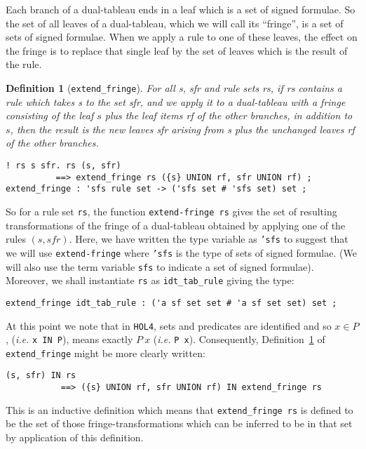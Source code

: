 \documentclass[a4paper]{article}
\newtheorem{definition}{Definition}
\newcommand{\hol}{\texttt{HOL4}}
\newcommand{\ie}{\textit{i.e. }}
\begin{document}
Each branch of a dual-tableau ends in a leaf which is a set of
signed formulae. So the set of all leaves of a dual-tableau, which we 
will call its ``fringe'', is a set of sets of signed formulae. 
When we apply a rule to one of these leaves, the effect on the fringe
is to replace that single leaf by the set of leaves 
which is the result of the rule.  
\begin{definition}[\texttt{extend\_fringe}]\label{extend-fringe}
  For all \textit{s}, \textit{sfr} and rule sets \textit{rs}, if
  \textit{rs} contains a rule which takes \textit{s} to the set
  \textit{sfr}, and we apply it to a dual-tableau with a fringe consisting
  of the leaf $s$ plus the 
  leaf items \textit{rf} of the other branches, in addition to
  $s$, then the result is the new leaves \textit{sfr} arising
  from \textit{s} plus the unchanged leaves \textit{rf} of the other
  branches.
\begin{verbatim}
! rs s sfr. rs (s, sfr) 
          ==> extend_fringe rs ({s} UNION rf, sfr UNION rf) ;
extend_fringe : 'sfs rule set -> ('sfs set # 'sfs set) set ;
\end{verbatim}
\end{definition}

So for a rule set \texttt{rs}, the function
\texttt{extend-fringe rs} gives the set of resulting transformations
of the fringe of a dual-tableau obtained by applying one of the rules
$(s, \mathit{sfr})$.
%
Here, we have written 
the type variable as \texttt{'sfs} to suggest that we will
use \texttt{extend-fringe} where \texttt{'sfs} is  the type of sets of signed
formulae. (We will also use the term variable \texttt{sfs} to indicate
a set of signed formulae).
Moreover, we shall instantiate \texttt{rs} as
\texttt{idt\_tab\_rule} giving the type:
\begin{verbatim}
extend_fringe idt_tab_rule : ('a sf set set # 'a sf set set) set ; 
\end{verbatim}

At this point we note that in \hol, sets and predicates are identified
and so $x \in P$, (\ie \texttt{x IN P}), means exactly $P\
x$ (\ie \texttt{P x}).
Consequently, 
Definition~\ref{extend-fringe} of \texttt{extend\_fringe} might be more clearly written:
\begin{verbatim}
(s, sfr) IN rs 
           ==> ({s} UNION rf, sfr UNION rf) IN extend_fringe rs
\end{verbatim}
This is an inductive definition which means that \texttt{extend\_fringe rs}
is defined to be the set of those fringe-transformations which can
be inferred to be in that set by application of this definition.
\end{document}

